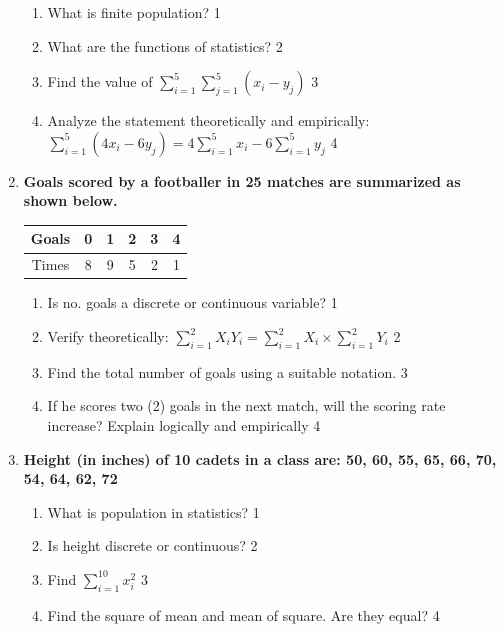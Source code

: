 \documentclass[a4paper,oneside]{book}
\begin{document}
\begin{enumerate}
  \begin{enumerate}
    \item
	What is finite population? \hfill 1
    \item
	What are the functions of statistics? \hfill 2
    \item  
	Find the value of $\displaystyle \sum_{i=1}^5 \sum_{j=1}^5 (x_i - y_j)$ \hfill 3
    \item
	Analyze the statement theoretically and empirically:  $\displaystyle \sum_{i=1}^5 (4x_i-6y_j) = 4 \sum_{i=1}^5 x_i - 6 \sum_{i=1}^5 y_j $ \hfill 4
  \end{enumerate}

\item
	  \textbf{Goals scored by a footballer in 25 matches are summarized as shown below.} 
	  
	  \begin{table}[h]
	  \centering
\begin{tabular}{|c|ccccc|}
Goals & 0 & 1 & 2 & 3 & 4 \\ \hline
Times & 8 & 9 & 5 & 2 & 1
\end{tabular}
\end{table}
  
  \begin{enumerate}
    \item
	Is no. goals a discrete or continuous variable? \hfill 1
    \item
	Verify theoretically: $\displaystyle \sum_{i=1}^{2} X_iY_i = \sum_{i=1}^{2} X_i \times \sum_{i=1}^{2} Y_i$ \hfill 2
    \item  
	Find the total number of goals using a suitable notation. \hfill 3
    \item
	If he scores two (2) goals in the next match, will the scoring rate increase? Explain logically and empirically \hfill 4
  \end{enumerate}

 \item
	  \textbf{Height (in inches) of 10 cadets in a class are: 50, 60, 55, 65, 66, 70, 54, 64, 62, 72} 
	 
  \begin{enumerate}
    \item
	What is population in statistics? \hfill 1
    \item
	Is height discrete or continuous? \hfill 2
    \item  
	Find $\displaystyle \sum_{i=1}^{10} x_i^2$ \hfill 3
    \item
	Find the square of mean and mean of square. Are they equal? \hfill 4
  \end{enumerate}
  

\end{enumerate}
\end{document}
